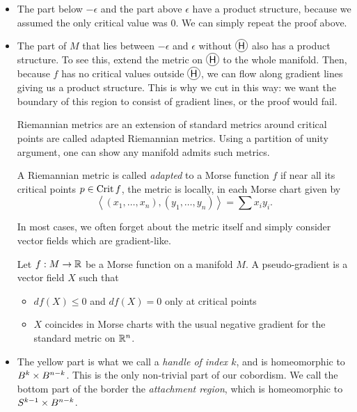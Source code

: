\begin{itemize}
    \item[\circled{A}] The part below $-\epsilon$ and the part above $\epsilon$ have a product structure, because we assumed the only critical value was $0$.
        We can simply repeat the proof above.
    \item[\circled{B}] The part of $M$ that lies between $-\epsilon$  and $\epsilon$ without $\circled{H}$ also has a product structure.
        To see this, extend the metric on $\circled{H}$ to the whole manifold. Then, because $f$ has no critical values outside $\circled{H}$, we can flow along gradient lines giving us a product structure.
        This is why we cut in this way: we want the boundary of this region to consist of gradient lines, or the proof would fail.

        Riemannian metrics are an extension of standard metrics around critical points are called adapted Riemannian metrics.
        Using a partition of unity argument, one can show any manifold admits such metrics.
        \begin{definition}
            A Riemannian  metric is called \emph{adapted} to a Morse function $f$ if near all its critical points $p \in \operatorname{Crit} f$, the metric is locally, in each Morse chart given by
            \[
            \left<
            (x_1, \ldots, x_n), 
            (y_1, \ldots, y_n)
            \right> = \sum x_i y_i
            .\] 
        \end{definition}
        In most cases, we often forget about the metric itself and simply consider vector fields which are gradient-like.

        \begin{definition}
            Let $f: M \to  \mathbb{R}$ be a Morse function on a manifold $M$. A pseudo-gradient is a vector field $X$ such that
            \begin{itemize}
                \item $df(X) \le 0$ and $df(X) = 0$ only at critical points
                \item $X$ coincides in Morse charts with the usual negative gradient for the standard metric on $\mathbb{R}^{n}$.
            \end{itemize}
        \end{definition}




    \item[\circled{H}]  The yellow part is what we call a \emph{handle of index $k$}, and is homeomorphic to $B^{k} \times B^{n-k}$.
        This is the only non-trivial part of our cobordism.
        We call the bottom part of the border the \emph{attachment region}, which is homeomorphic to $S^{k-1} \times B^{n-k}$.
\end{itemize}


